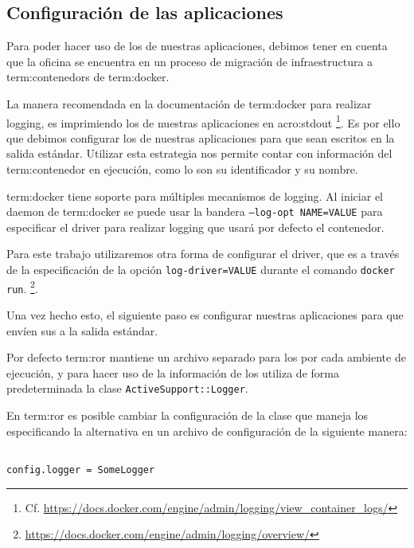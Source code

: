 \subsection{Configuración de las aplicaciones}
\label{configuracion_de_las_aplicaciones}

Para poder hacer uso de los  de nuestras aplicaciones, debimos tener en
cuenta que la oficina se encuentra en un proceso de migración de
infraestructura a \glspl{term:contenedor} de \gls{term:docker}.

La manera recomendada en la documentación de \gls{term:docker} para realizar
logging, es imprimiendo los  de nuestras aplicaciones en \gls{acro:stdout}
\footnote{Cf. \url{https://docs.docker.com/engine/admin/logging/view_container_logs/}}.
Es por ello que debimos configurar los  de nuestras aplicaciones para que sean
escritos en la salida estándar. Utilizar esta estrategia nos permite contar
con información del \gls{term:contenedor} en ejecución, como lo son su identificador y su
nombre.

\gls{term:docker} tiene soporte para múltiples mecanismos de logging. Al
iniciar el daemon de \gls{term:docker} se puede usar la bandera
\texttt{--log-opt NAME=VALUE} para especificar el driver para realizar logging
que usará por defecto el contenedor.

Para este trabajo utilizaremos otra forma de configurar el driver, que es a
través de la especificación de la opción \texttt{log-driver=VALUE} durante el
comando \lstinline{docker run}.
\footnote{\url{https://docs.docker.com/engine/admin/logging/overview/}}.

Una vez hecho esto, el siguiente paso es configurar nuestras aplicaciones para
que envíen sus  a la salida estándar.

Por defecto \gls{term:ror} mantiene un archivo separado para los  por cada
ambiente de ejecución, y para hacer uso de la información de los  utiliza
de forma predeterminada la clase \texttt{ActiveSupport::Logger}.

En \gls{term:ror} es posible cambiar la configuración de la clase que maneja los
 especificando la alternativa en un archivo de configuración de la siguiente manera:

\begin{lstlisting}

config.logger = SomeLogger

\end{lstlisting}


